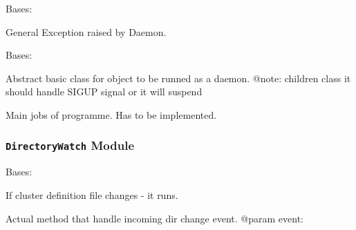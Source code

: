 \documentclass[a4paper,11pt,openany]{sphinxmanual}
\begin{document}

\begin{fulllineitems}
\label{ref-manual/XrdTest:XrdTest.Daemon.DaemonException}
Bases: 

General Exception raised by Daemon.

\end{fulllineitems}


\begin{fulllineitems}
\label{ref-manual/XrdTest:XrdTest.Daemon.Runnable}
Bases: 

Abstract basic class for object to be runned as a daemon.
@note: children class it should handle SIGUP signal or it will suspend

\begin{fulllineitems}
\label{ref-manual/XrdTest:XrdTest.Daemon.Runnable.run}
Main jobs of programme. Has to be implemented.

\end{fulllineitems}


\end{fulllineitems}



\subsubsection{\texttt{DirectoryWatch} Module}
\label{ref-manual/XrdTest:directorywatch-module}\label{ref-manual/XrdTest:module-XrdTest.DirectoryWatch}

\begin{fulllineitems}
\label{ref-manual/XrdTest:XrdTest.DirectoryWatch.ClustersDefinitionsChangeHandler}
Bases: 

If cluster definition file changes - it runs.

\begin{fulllineitems}
\label{ref-manual/XrdTest:XrdTest.DirectoryWatch.ClustersDefinitionsChangeHandler.process_default}
Actual method that handle incoming dir change event.
@param event:

\end{fulllineitems}


\end{fulllineitems}
\end{document}
